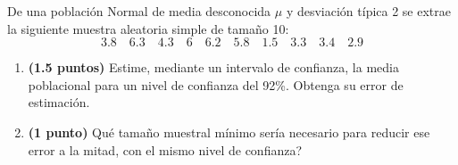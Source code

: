 
De una población Normal de media desconocida $\mu$ y desviación típica 2 se extrae la siguiente muestra aleatoria simple de tamaño 10:
\[
3.8\quad6.3\quad4.3\quad6\quad6.2\quad5.8\quad1.5\quad3.3\quad3.4\quad2.9
\]
\begin{enumerate}[label=\alph*)]
\item \textbf{(1.5 puntos)} Estime, mediante un intervalo de confianza, la media poblacional para un nivel de confianza del 92\%. Obtenga su error de estimación.
\item \textbf{(1 punto)} \textquestiondown{}Qué tamaño muestral mínimo sería necesario para reducir ese error a la mitad, con el mismo nivel de confianza?
\end{enumerate}
